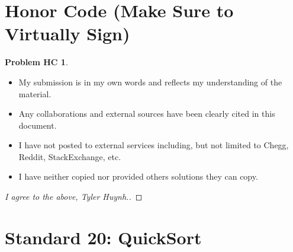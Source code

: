 \documentclass[11pt]{article}
\theoremstyle{definition}
\theoremstyle{definition}
\newtheorem*{requiredHC}{Problem HC}
\theoremstyle{definition}
\newcommand{\standard}{20}
\begin{document}
\newpage
\section*{Honor Code (Make Sure to Virtually Sign)} \label{HonorCode}
\hypertarget{HonorCode}{}

\begin{requiredHC}
\begin{itemize}
\item My submission is in my own words and reflects my understanding of the material.
\item Any collaborations and external sources have been clearly cited in this document.
\item I have not posted to external services including, but not limited to Chegg, Reddit, StackExchange, etc.
\item I have neither copied nor provided others solutions they can copy.
\end{itemize}

\end{requiredHC}

\begin{proof}[I agree to the above, Tyler Huynh.]
\end{proof}


\newpage
\setcounter{section}{\standard-1}
\section{Standard \standard: QuickSort}
\end{document}
